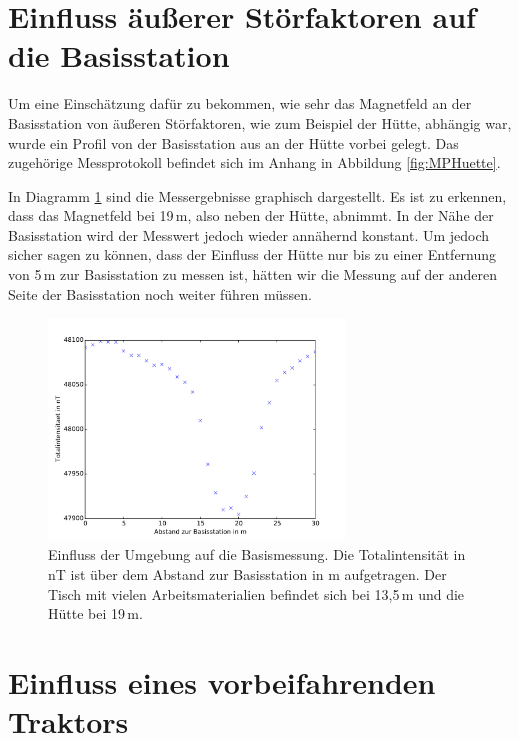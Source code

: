 \section{Einfluss äußerer Störfaktoren auf die Basisstation}

Um eine Einschätzung dafür zu bekommen, wie sehr das Magnetfeld an der Basisstation von äußeren Störfaktoren, wie zum Beispiel der Hütte, abhängig war, wurde ein Profil von der Basisstation aus an der Hütte vorbei gelegt. Das zugehörige Messprotokoll befindet sich im Anhang in Abbildung \ref{fig:MPHuette}.

In Diagramm \ref{fig:plot_huette} sind die Messergebnisse graphisch dargestellt. Es ist zu erkennen, dass das Magnetfeld bei 19\,m, also neben der Hütte, abnimmt. In der Nähe der Basisstation wird der Messwert jedoch wieder annähernd konstant. Um jedoch sicher sagen zu können, dass der Einfluss der Hütte nur bis zu einer Entfernung von 5\,m zur Basisstation zu messen ist, hätten wir die Messung auf der anderen Seite der Basisstation noch weiter führen müssen.

\begin{figure}[!ht]
 \centering
 \includegraphics[width=0.7\textwidth]{fig/plot_huette.pdf}
 \caption[Einfluss der Umgebung auf die Basismessung]{Einfluss der Umgebung auf die Basismessung. Die Totalintensität in nT ist über dem Abstand zur Basisstation in m aufgetragen. Der Tisch mit vielen Arbeitsmaterialien befindet sich bei 13,5\,m und die Hütte bei 19\,m.}
 \label{fig:plot_huette}
\end{figure}


\section{Einfluss eines vorbeifahrenden Traktors}

